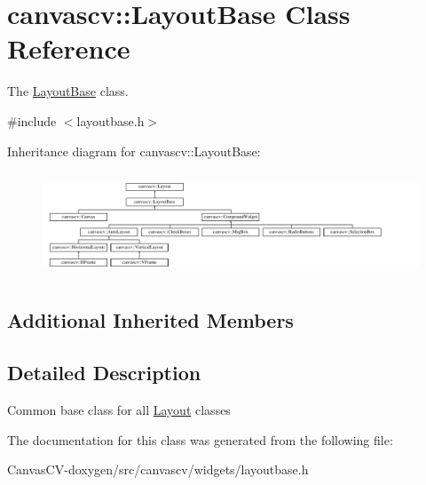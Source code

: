 \hypertarget{classcanvascv_1_1LayoutBase}{}\section{canvascv\+:\+:Layout\+Base Class Reference}
\label{classcanvascv_1_1LayoutBase}


The \hyperlink{classcanvascv_1_1LayoutBase}{Layout\+Base} class.  




{\ttfamily \#include $<$layoutbase.\+h$>$}

Inheritance diagram for canvascv\+:\+:Layout\+Base\+:\begin{figure}[H]
\begin{center}
\leavevmode
\includegraphics[height=3.128491cm]{classcanvascv_1_1LayoutBase}
\end{center}
\end{figure}
\subsection*{Additional Inherited Members}


\subsection{Detailed Description}
Common base class for all \hyperlink{classcanvascv_1_1Layout}{Layout} classes 

The documentation for this class was generated from the following file\+:\begin{DoxyCompactItemize}
\item 
Canvas\+C\+V-\/doxygen/src/canvascv/widgets/layoutbase.\+h\end{DoxyCompactItemize}

